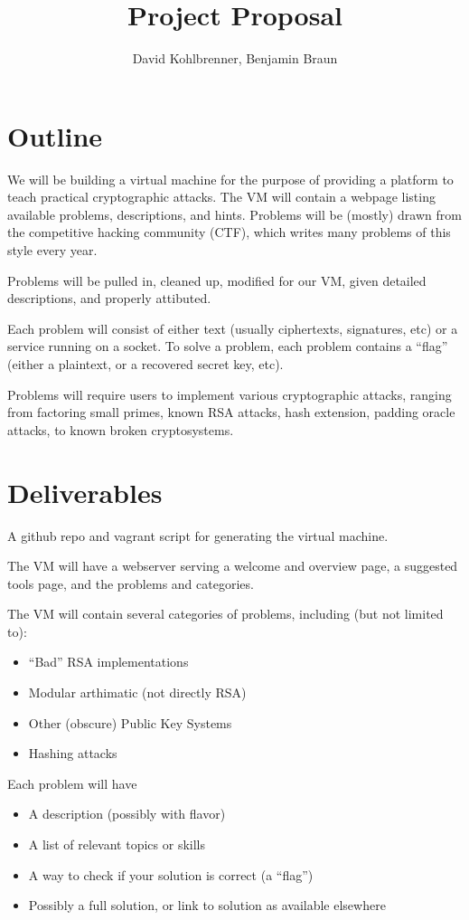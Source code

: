 \documentclass{article}
\begin{document}
\title{Project Proposal}
\author{David Kohlbrenner, Benjamin Braun}
\maketitle


\section{Outline}
We will be building a virtual machine for the purpose of providing a
platform to teach practical cryptographic attacks. The VM will contain
a webpage listing available problems, descriptions, and
hints. Problems will be (mostly) drawn from the competitive hacking
community (CTF), which writes many problems of this style every year.

Problems will be pulled in, cleaned up, modified for our VM, given
detailed descriptions, and properly attibuted.

Each problem will consist of either text (usually ciphertexts,
signatures, etc) or a service running on a socket. To solve a problem,
each problem contains a ``flag'' (either a plaintext, or a recovered
secret key, etc).

Problems will require users to implement various cryptographic
attacks, ranging from factoring small primes, known RSA attacks, hash
extension, padding oracle attacks, to known broken cryptosystems.

\section{Deliverables}
A github repo and vagrant script for generating the virtual machine.

The VM will have a webserver serving a welcome and overview page, a
suggested tools page, and the problems and categories.

The VM will contain several categories of problems, including (but not limited to):
\begin{itemize}
\item ``Bad'' RSA implementations
\item Modular arthimatic (not directly RSA)
\item Other (obscure) Public Key Systems
\item Hashing attacks
\end{itemize}

Each problem will have
\begin{itemize}
\item A description (possibly with flavor)
\item A list of relevant topics or skills
\item A way to check if your solution is correct (a ``flag'')
\item Possibly a full solution, or link to solution as available elsewhere
\end{itemize}
\end{document}
